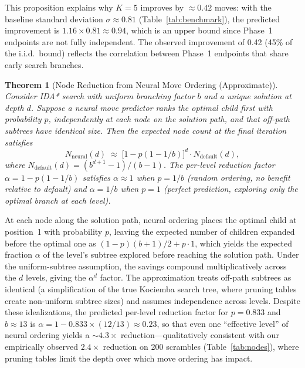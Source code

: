 \documentclass[conference]{IEEEtran}
\newtheorem{theorem}{Theorem}
\begin{document}
This proposition explains why $K=5$ improves by $\approx 0.42$ moves: with the baseline standard deviation $\sigma \approx 0.81$ (Table~\ref{tab:benchmark}), the predicted improvement is $1.16 \times 0.81 \approx 0.94$, which is an upper bound since Phase~1 endpoints are not fully independent. The observed improvement of 0.42 (45\% of the i.i.d.\ bound) reflects the correlation between Phase~1 endpoints that share early search branches.

\begin{theorem}[Node Reduction from Neural Move Ordering (Approximate)]
\label{thm:node-reduction}
Consider IDA* search with uniform branching factor $b$ and a unique solution at depth $d$. Suppose a neural move predictor ranks the optimal child first with probability $p$, independently at each node on the solution path, and that off-path subtrees have identical size. Then the expected node count at the final iteration satisfies
\begin{equation}
N_{\text{neural}}(d) \;\approx\; \bigl[1 - p(1 - 1/b)\bigr]^{d} \cdot N_{\text{default}}(d),
\end{equation}
where $N_{\text{default}}(d) = (b^{d+1}-1)/(b-1)$. The per-level reduction factor $\alpha = 1 - p(1-1/b)$ satisfies $\alpha \approx 1$ when $p = 1/b$ (random ordering, no benefit relative to default) and $\alpha = 1/b$ when $p = 1$ (perfect prediction, exploring only the optimal branch at each level).
\end{theorem}
\begin{IEEEproof}
At each node along the solution path, neural ordering places the optimal child at position~1 with probability $p$, leaving the expected number of children expanded before the optimal one as $(1-p)(b+1)/2 + p \cdot 1$, which yields the expected fraction $\alpha$ of the level's subtree explored before reaching the solution path. Under the uniform-subtree assumption, the savings compound multiplicatively across the $d$ levels, giving the $\alpha^d$ factor. The approximation treats off-path subtrees as identical (a simplification of the true Kociemba search tree, where pruning tables create non-uniform subtree sizes) and assumes independence across levels. Despite these idealizations, the predicted per-level reduction factor for $p = 0.833$ and $b \approx 13$ is $\alpha = 1 - 0.833 \times (12/13) \approx 0.23$, so that even one ``effective level'' of neural ordering yields a $\sim$$4.3{\times}$ reduction---qualitatively consistent with our empirically observed $2.4{\times}$ reduction on 200 scrambles (Table~\ref{tab:nodes}), where pruning tables limit the depth over which move ordering has impact.
\end{IEEEproof}
\end{document}
